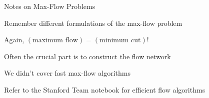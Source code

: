 \documentclass[13pt,onlymath]{beamer}
\begin{document}
\begin{frame}{Notes on Max-Flow Problems}
\BIT
\item Remember different formulations of the max-flow problem
\BIT
\item Again, $(\mbox{maximum flow})=(\mbox{minimum cut})$!
\EIT
\item Often the crucial part is to construct the flow network
\item We didn't cover fast max-flow algorithms
\BIT
\item Refer to the Stanford Team notebook for efficient flow algorithms
\EIT \EIT
\end{frame}
\end{document}
